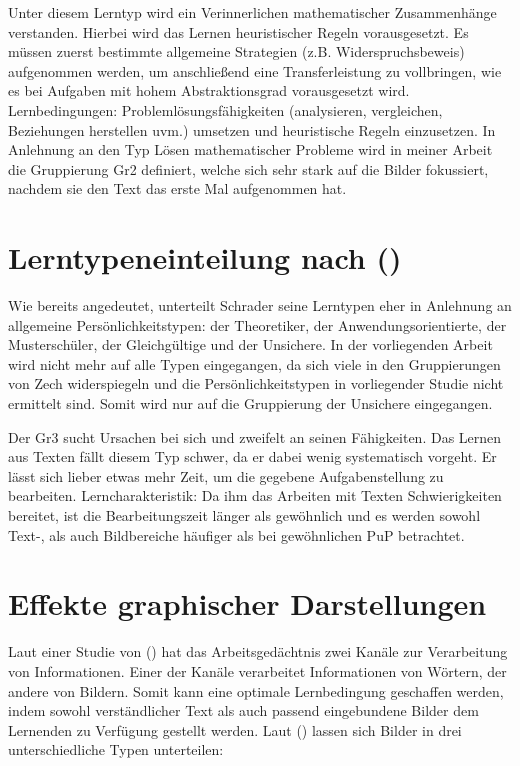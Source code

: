 Unter diesem Lerntyp wird ein Verinnerlichen mathematischer Zusammenhänge verstanden. Hierbei wird das Lernen heuristischer Regeln vorausgesetzt. Es müssen zuerst bestimmte allgemeine Strategien (z.B. Widerspruchsbeweis) aufgenommen werden, um anschließend eine Transferleistung zu vollbringen, wie es bei Aufgaben mit hohem Abstraktionsgrad vorausgesetzt wird. 
Lernbedingungen: Problemlösungsfähigkeiten (analysieren, vergleichen, Beziehungen herstellen uvm.) umsetzen und heuristische Regeln einzusetzen.
In Anlehnung an den Typ Lösen mathematischer Probleme wird in meiner Arbeit die Gruppierung \gls{Gr2} definiert, welche sich sehr stark auf die Bilder fokussiert, nachdem sie den Text das erste Mal aufgenommen hat.

\section{Lerntypeneinteilung nach \citeauthor{schrader2008lerntypen} ()}

Wie bereits angedeutet, unterteilt Schrader seine Lerntypen eher in Anlehnung an allgemeine Persönlichkeitstypen: der Theoretiker, der Anwendungsorientierte, der Musterschüler, der Gleichgültige und der Unsichere. In der vorliegenden Arbeit wird nicht mehr auf alle Typen eingegangen, da sich viele in den Gruppierungen von Zech widerspiegeln und die Persönlichkeitstypen in vorliegender Studie nicht ermittelt sind. Somit wird nur auf die Gruppierung der Unsichere eingegangen.

Der \gls{Gr3} sucht Ursachen bei sich und zweifelt an seinen Fähigkeiten. Das Lernen aus Texten fällt diesem Typ schwer, da er dabei wenig systematisch vorgeht. Er lässt sich lieber etwas mehr Zeit, um die gegebene Aufgabenstellung zu bearbeiten.
Lerncharakteristik: Da ihm das Arbeiten mit Texten Schwierigkeiten bereitet, ist die Bearbeitungszeit länger als gewöhnlich und es werden sowohl Text-, als auch Bildbereiche häufiger als bei gewöhnlichen \gls{PuP} betrachtet. 

\section{Effekte graphischer Darstellungen}

Laut einer Studie von \citeauthor{mayer2005reliability} () hat das Arbeitsgedächtnis zwei Kanäle zur Verarbeitung von Informationen. Einer der Kanäle verarbeitet Informationen von Wörtern, der andere von Bildern. Somit kann eine optimale Lernbedingung geschaffen werden, indem sowohl verständlicher Text als auch passend eingebundene Bilder dem Lernenden zu Verfügung gestellt werden. Laut \citeauthor{bockmannvalue} () lassen sich Bilder in drei unterschiedliche Typen unterteilen:
    
